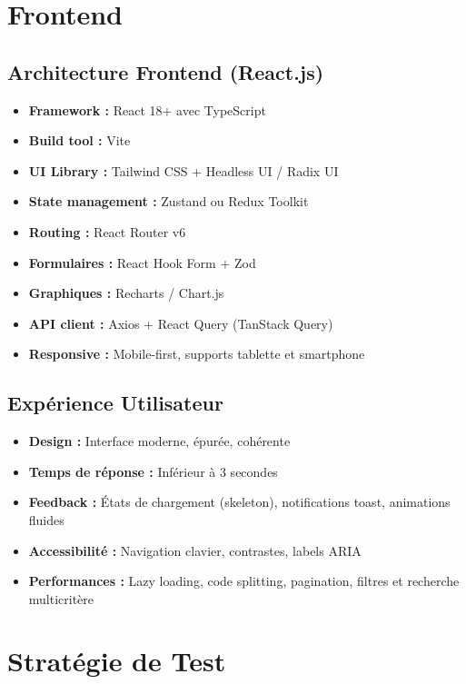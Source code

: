 \documentclass[12pt,a4paper]{report}
\begin{document}
\chapter{Frontend}

\section{Architecture Frontend (React.js)}
\begin{itemize}
    \item \textbf{Framework :} React 18+ avec TypeScript
    \item \textbf{Build tool :} Vite
    \item \textbf{UI Library :} Tailwind CSS + Headless UI / Radix UI
    \item \textbf{State management :} Zustand ou Redux Toolkit
    \item \textbf{Routing :} React Router v6
    \item \textbf{Formulaires :} React Hook Form + Zod
    \item \textbf{Graphiques :} Recharts / Chart.js
    \item \textbf{API client :} Axios + React Query (TanStack Query)
    \item \textbf{Responsive :} Mobile-first, supports tablette et smartphone
\end{itemize}

\section{Expérience Utilisateur}
\begin{itemize}
    \item \textbf{Design :} Interface moderne, épurée, cohérente
    \item \textbf{Temps de réponse :} Inférieur à 3 secondes
    \item \textbf{Feedback :} États de chargement (skeleton), notifications toast, animations fluides
    \item \textbf{Accessibilité :} Navigation clavier, contrastes, labels ARIA
    \item \textbf{Performances :} Lazy loading, code splitting, pagination, filtres et recherche multicritère
\end{itemize}

\chapter{Stratégie de Test}
\end{document}
